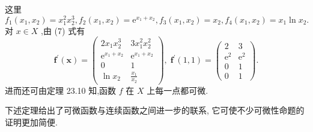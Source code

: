 \begin{solution}

\end{solution}
这里
\[
{f}_{1}\left( {{x}_{1},{x}_{2}}\right)  = {x}_{1}^{2}{x}_{2}^{3},{f}_{2}\left( {{x}_{1},{x}_{2}}\right)  = {\mathrm{e}}^{{x}_{1} + {x}_{2}},{f}_{3}\left( {{x}_{1},{x}_{2}}\right)  = {x}_{2},{f}_{4}\left( {{x}_{1},{x}_{2}}\right)  = {x}_{1}\ln {x}_{2}.
\]
对 \(x \in  X\) ,由 (7) 式有
\[
{\mathbf{f}}^{\prime }\left( \mathbf{x}\right)  = \left( \begin{matrix} 2{x}_{1}{x}_{2}^{3} & 3{x}_{1}^{2}{x}_{2}^{2} \\  {\mathrm{e}}^{{x}_{1} + {x}_{2}} & {\mathrm{e}}^{{x}_{1} + {x}_{2}} \\  0 & 1 \\  \ln {x}_{2} & \frac{{x}_{1}}{{x}_{2}} \end{matrix}\right) ,\;{\mathbf{f}}^{\prime }\left( {1,1}\right)  = \left( \begin{matrix} 2 & 3 \\  {\mathrm{e}}^{2} & {\mathrm{e}}^{2} \\  0 & 1 \\  0 & 1 \end{matrix}\right) .
\]
进而还可由定理 23.10 知,函数 \(f\) 在 \(X\) 上每一点都可微.

下述定理给出了可微函数与连续函数之间进一步的联系, 它可使不少可微性命题的证明更加简便.

